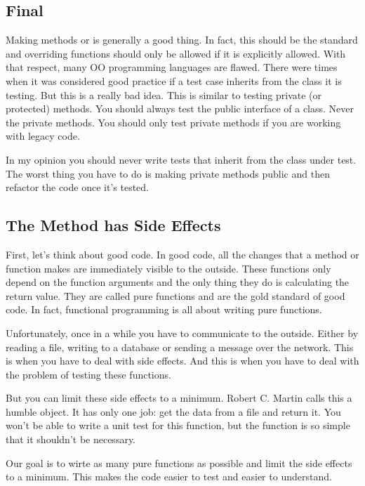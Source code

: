 \subsection{Final}

Making methods  or  is generally a good thing. In fact, this should be the standard and overriding functions should only be allowed if it is explicitly allowed. With that respect, many OO programming languages are flawed. There were times when it was considered good practice if a test case inherits from the class it is testing. But this is a really bad idea. This is similar to testing private (or protected) methods. You should always test the public interface of a class. Never the private methods. You should only test private methods if you are working with legacy code.

In my opinion you should never write tests that inherit from the class under test. The worst thing you have to do is making private methods public and then refactor the code once it's tested.

\subsection{The Method has Side Effects}

First, let's think about good code. In good code, all the changes that a method or function makes are immediately visible to the outside. These functions only depend on the function arguments and the only thing they do is calculating the return value. They are called pure functions and are the gold standard of good code. In fact, functional programming is all about writing pure functions.

Unfortunately, once in a while you have to communicate to the outside. Either by reading a file, writing to a database or sending a message over the network. This is when you have to deal with side effects. And this is when you have to deal with the problem of testing these functions.

But you can limit these side effects to a minimum. Robert C. Martin calls this a humble object. It has only one job: get the data from a file and return it. You won't be able to write a unit test for this function, but the function is so simple that it shouldn't be necessary.

Our goal is to wirte as many pure functions as possible and limit the side effects to a minimum. This makes the code easier to test and easier to understand.

